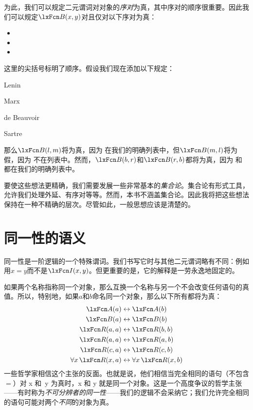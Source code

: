 为此，我们可以规定二元谓词对对象的\emph{序对}为真，其中序对的顺序很重要。因此我们可以规定$\atom{B}{x,y}$对且仅对以下序对为真：

\begin{itemize}
		\item {}
		\item {}
		\item {}
	\end{itemize}

这里的尖括号标明了顺序。假设我们现在添加以下规定：

\begin{ekey}
		\item[l] Lenin
		\item[m] Marx
		\item[b] de Beauvoir
		\item[r] Sartre
	\end{ekey}

那么$\atom{B}{l,m}$将为真，因为  在我们的明确列表中，但$\atom{B}{m,l}$将为假，因为  不在列表中。然而，$\atom{B}{b,r}$和$\atom{B}{r,b}$都将为真，因为  和  都在我们的明确列表中。

要使这些想法更精确，我们需要发展一些非常基本的\emph{集合论}。集合论有形式工具，允许我们处理外延、有序对等等。然而，本书不涵盖集合论。因此我将把这些想法保持在一种不精确的层次。尽管如此，一般思想应该是清楚的。

\section{同一性的语义}
同一性是一阶逻辑的一个特殊谓词。我们书写它时与其他二元谓词略有不同：例如用$x=y$而不是$\atom{I}{x,y}$。但更重要的是，它的解释是一劳永逸地固定的。

如果两个名称指称同一个对象，那么互换一个名称与另一个不会改变任何语句的真值。所以，特别地，如果$a$和$b$命名同一个对象，那么以下所有都将为真：\label{model.nonidentity}
	\begin{align*}
	 	\atom{A}{a} &\eiff \atom{A}{b} \\
	 	\atom{B}{a} &\eiff \atom{B}{b}\\
		\atom{R}{a,a} &\eiff \atom{R}{b,b}\\
		\atom{R}{a,a} & \eiff \atom{R}{a,b}\\
		\atom{R}{c,a} &\eiff \atom{R}{c,b}\\
		\forall x\, \atom{R}{x,a} &\eiff \forall x\, \atom{R}{x,b}
	\end{align*}
一些哲学家相信这个主张的反面。也就是说，他们相信当完全相同的语句（不包含$=$）对 x 和~y 为真时，x 和 y 就是同一个对象。这是一个高度争议的哲学主张——有时称为\emph{不可分辨者的同一性}——我们的逻辑不会采纳它；我们允许完全相同的语句可能对两个\emph{不同}的对象为真。

